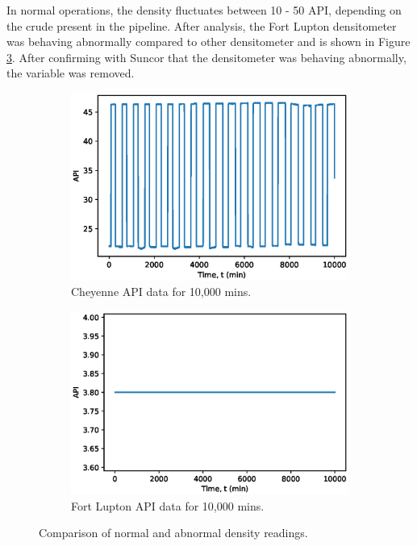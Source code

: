 In normal operations, the density fluctuates between 10 - 50 API, depending on the crude present in the pipeline.  After analysis, the Fort Lupton densitometer was behaving abnormally compared to other densitometer and is shown in Figure \ref{fig:08Density}.  After confirming with Suncor that the densitometer was behaving abnormally, the variable was removed.  
\begin{figure}[h]
     \centering
     \begin{subfigure}[b]{0.48\textwidth}
         \centering
         \includegraphics[width=\textwidth]{images/08CheyDensity.eps}
         \caption{Cheyenne API data for 10,000 mins.}
         \label{fig:08GoodDensity}
     \end{subfigure}
     \hfill
     \begin{subfigure}[b]{0.48\textwidth}
         \centering
         \includegraphics[width=\textwidth]{images/08FLDensity.eps}
         \caption{Fort Lupton API data for 10,000 mins.}
         \label{fig:08BadDensity}
     \end{subfigure}
        \caption{Comparison of normal and abnormal density readings.}
        \label{fig:08Density}
\end{figure}

